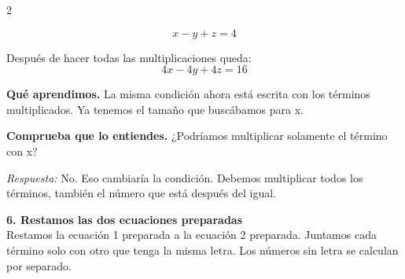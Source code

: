 \documentclass[11pt,a4paper,landscape]{article}
\begin{document}
\begin{multicols*}{2}
\begin{minipage}{\linewidth}
\[x - y + z = 4\]
\par{}\par\smallskip
\par\smallskip Después de hacer todas las multiplicaciones queda:
\[4x - 4y + 4z = 16\]
\par\smallskip\textbf{Qué aprendimos.} La misma condición ahora está escrita con los términos multiplicados. Ya tenemos el tamaño que buscábamos para x.
\par\smallskip\textbf{Comprueba que lo entiendes.} ¿Podríamos multiplicar solamente el término con x?\par\textit{Respuesta:} No. Eso cambiaría la condición. Debemos multiplicar todos los términos, también el número que está después del igual.
\end{minipage}\par\medskip
\noindent\begin{minipage}{\linewidth}\textbf{6. Restamos las dos ecuaciones preparadas}\\[2pt]Restamos la ecuación 1 preparada a la ecuación 2 preparada. Juntamos cada término solo con otro que tenga la misma letra. Los números sin letra se calculan por separado.
\par{}\par\smallskip

\end{minipage}
\end{multicols*}
\end{document}
